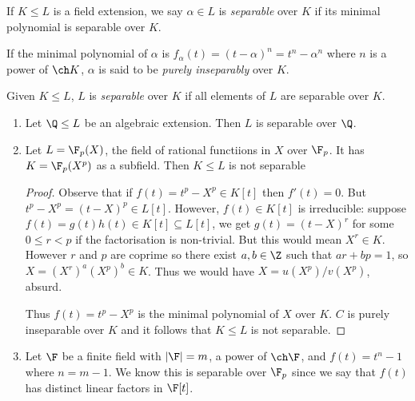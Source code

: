 \documentclass[a4paper]{article}
\begin{document}
\begin{definition}
  If \(K \leq L\) is a field extension, we say \(\alpha \in L\) is \emph{separable} over \(K\) if its minimal polynomial is separable over \(K\).
\end{definition}

\begin{definition}
  If the minimal polynomial of \(\alpha\) is \(f_\alpha(t) = (t - \alpha)^n = t^n - \alpha^n\) where \(n\) is a power of \(\ch K\), \(\alpha\) is said to be \emph{purely inseparably} over \(K\).
\end{definition}

\begin{definition}
  Given \(K \leq L\), \(L\) is \emph{separable} over \(K\) if all elements of \(L\) are separable over \(K\).
\end{definition}

\begin{eg}\leavevmode
  \begin{enumerate}
  \item Let \(\Q \leq L\) be an algebraic extension. Then \(L\) is separable over \(\Q\).
  \item Let \(L = \F_p(X)\), the field of rational functiions in \(X\) over \(\F_p\). It has \(K = \F_p(X^p)\) as a subfield. Then \(K \leq L\) is not separable
    \begin{proof}
      Observe that if \(f(t) = t^p - X^p \in K[t]\) then \(f'(t) = 0\). But \(t^p - X^p = (t - X)^p \in L[t]\). However, \(f(t) \in K[t]\) is irreducible: suppose \(f(t) = g(t)h(t) \in K[t] \subseteq L[t]\), we get \(g(t) = (t - X)^r\) for some \(0 \leq r < p\) if the factorisation is non-trivial. But this would mean \(X^r \in K\). However \(r\) and \(p\) are coprime so there exist \(a, b \in \Z\) such that \(ar + bp = 1\), so \(X = (X^r)^a (X^p)^b \in K\). Thus we would have \(X = u(X^p)/v(X^p)\), absurd.

      Thus \(f(t) = t^p - X^p\) is the minimal polynomial of \(X\) over \(K\). \(C\) is purely inseparable over \(K\) and it follows that \(K \leq L\) is not separable.
    \end{proof}
  \item Let \(\F\) be a finite field with \(|\F| = m\), a power of \(\ch \F\), and \(f(t) = t^n - 1\) where \(n = m - 1\). We know this is separable over \(\F_p\) since we say that \(f(t)\) has distinct linear factors in \(\F[t]\).
  \end{enumerate}
\end{eg}
\end{document}
